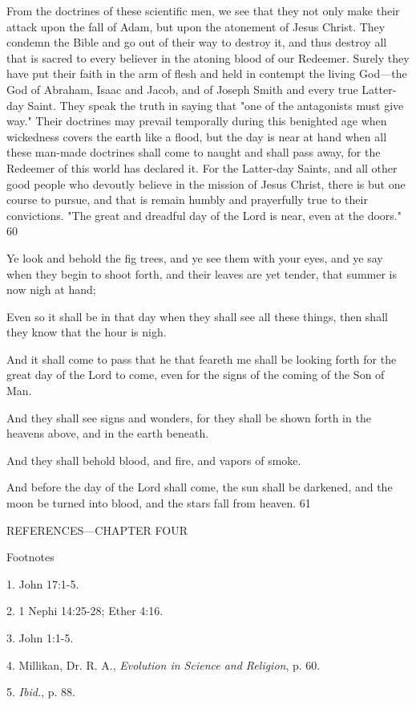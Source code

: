 From the doctrines of these scientific men, we see that they not only make their attack upon
the fall of Adam, but upon the atonement of Jesus Christ. They condemn the Bible and go out
of their way to destroy it, and thus destroy all that is sacred to every believer in the atoning
blood of our Redeemer. Surely they have put their faith in the arm of flesh and held in
contempt the living God—the God of Abraham, Isaac and Jacob, and of Joseph Smith and
every true Latter-day Saint. They speak the truth in saying that "one of the antagonists must
give way." Their doctrines may prevail temporally during this benighted age when
wickedness covers the earth like a flood, but the day is near at hand when all these man-made
doctrines shall come to naught and shall pass away, for the Redeemer of this world has
declared it. For the Latter-day Saints, and all other good people who devoutly believe in the
mission of Jesus Christ, there is but one course to pursue, and that is remain humbly and
prayerfully true to their convictions. "The great and dreadful day of the Lord is near, even at
the doors." 60

Ye look and behold the fig trees, and ye see them with your eyes, and ye say when they begin
to shoot forth, and their leaves are yet tender, that summer is now nigh at hand;

Even so it shall be in that day when they shall see all these things, then shall they know that
the hour is nigh.

And it shall come to pass that he that feareth me shall be looking forth for the great day of the
Lord to come, even for the signs of the coming of the Son of Man.

And they shall see signs and wonders, for they shall be shown forth in the heavens above,
and in the earth beneath.

And they shall behold blood, and fire, and vapors of smoke.

And before the day of the Lord shall come, the sun shall be darkened, and the moon be
turned into blood, and the stars fall from heaven. 61

\newpage
REFERENCES—CHAPTER FOUR

Footnotes

1. John 17:1-5.

2. 1 Nephi 14:25-28; Ether 4:16.

3. John 1:1-5.

4. Millikan, Dr. R. A., \textit{Evolution in Science and Religion}, p. 60.

5. \textit{Ibid.}, p. 88.


